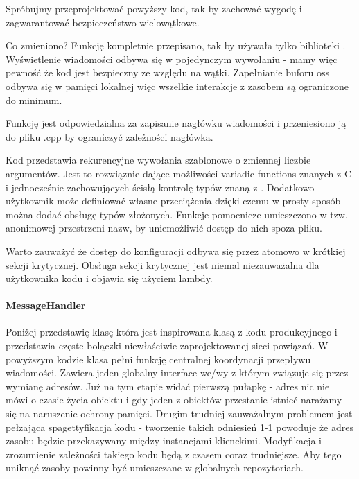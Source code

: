Spróbujmy przeprojektować powyższy kod, tak by zachować wygodę  i zagwarantować bezpieczeństwo wielowątkowe.

Co zmieniono?
Funkcję  kompletnie przepisano, tak by używała tylko biblioteki \Cpp{}. Wyświetlenie wiadomości odbywa się w pojedynczym wywołaniu  - mamy więc pewność że kod jest bezpieczny ze względu na wątki. Zapełnianie buforu oss odbywa się w pamięci lokalnej więc wszelkie interakcje z zasobem  są ograniczone do minimum.

Funkcję  jest odpowiedzialna za zapisanie nagłówku wiadomości i przeniesiono ją do pliku .cpp by ograniczyć zależności nagłówka.

Kod  przedstawia rekurencyjne wywołania szablonowe o zmiennej liczbie argumentów. Jest to rozwiąznie dające możliwości variadic functions znanych z C i jednocześnie zachowujących ścisłą kontrolę typów znaną z \Cpp{}. Dodatkowo użytkownik może definiować własne przeciążenia  dzięki czemu w prosty sposób można dodać obsługę typów złożonych. Funkcje pomocnicze umieszczono w tzw. anonimowej przestrzeni nazw, by uniemożliwić dostęp do nich spoza pliku.

Warto zauważyć że dostęp do konfiguracji odbywa się przez  atomowo w krótkiej sekcji krytycznej. Obsługa sekcji krytycznej jest niemal niezauważalna dla użytkownika kodu i objawia się użyciem lambdy.

\paragraph{MessageHandler}
Poniżej przedstawię klasę  która jest inspirowana klasą z kodu produkcyjnego i przedstawia częste bolączki niewłaściwie zaprojektowanej sieci powiązań.
W powyższym kodzie klasa  pełni funkcję centralnej koordynacji przepływu wiadomości. Zawiera jeden globalny interface we/wy  z którym związuje się przez wymianę adresów. Już na tym etapie widać pierwszą pułapkę - adres nic nie mówi o czasie życia obiektu i gdy jeden z obiektów przestanie istnieć narażamy się na naruszenie ochrony pamięci. Drugim trudniej zauważalnym problemem jest pełzająca spagettyfikacja kodu - tworzenie takich odniesień 1-1 powoduje że adres zasobu będzie przekazywany między instancjami klienckimi. Modyfikacja i zrozumienie zależności takiego kodu będą z czasem coraz trudniejsze. Aby tego uniknąć zasoby powinny być umieszczane w globalnych repozytoriach.

